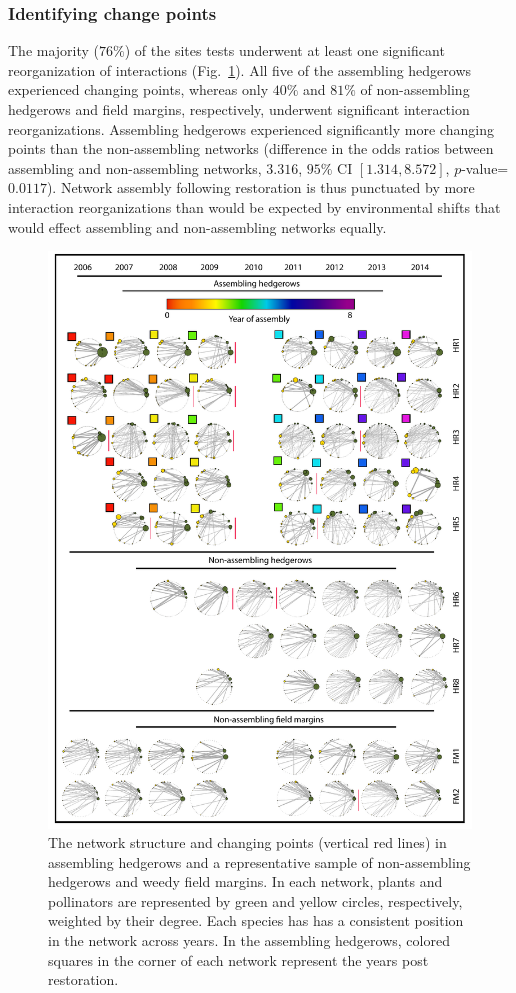 \documentclass[12pt]{article}
\begin{document}
\subsubsection*{Identifying change points}

The majority ($76\%$) of the sites tests underwent at least one
significant reorganization of interactions
(Fig.~\ref{fig:changePoints}).  All five of the assembling hedgerows
experienced changing points, whereas only $40\%$ and $81\%$ of
non-assembling hedgerows and field margins, respectively, underwent
significant interaction reorganizations. Assembling hedgerows
experienced significantly more changing points than the non-assembling
networks (difference in the odds ratios between assembling and
non-assembling networks, $3.316$, $95\%$ CI $[1.314, 8.572]$,
$p$-value= $0.0117$). Network assembly following restoration is thus
punctuated by more interaction reorganizations than would be expected
by environmental shifts that would effect assembling and
non-assembling networks equally.

\begin{figure}
  \centering
  \includegraphics[width=.8\textwidth]{../analysis/changePoint/plotting/networks.pdf}
  \caption{The network structure and changing points (vertical red
    lines) in assembling hedgerows and a representative sample of
    non-assembling hedgerows and weedy field margins. In each network,
    plants and pollinators are represented by green and yellow
    circles, respectively, weighted by their degree. Each species has
    has a consistent position in the network across years. In the
    assembling hedgerows, colored squares in the corner of each
    network represent the years post restoration.}
  \label{fig:changePoints}
\end{figure}
\clearpage
\end{document}
